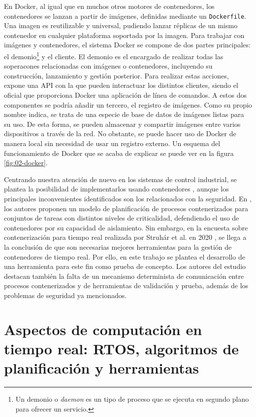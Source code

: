 En Docker, al igual que en muchos otros motores de contenedores, los
contenedores se lanzan a partir de imágenes, definidas mediante un
\texttt{Dockerfile}. Una imagen es reutilizable y universal, pudiendo lanzar
réplicas de un mismo contenedor en cualquier plataforma soportada por la imagen.
Para trabajar con imágenes y contenedores, el sistema Docker se compone de dos
partes principales: el demonio\footnote{Un demonio o \textit{daemon} es un tipo
  de proceso que se ejecuta en segundo plano para ofrecer un servicio.} y el
cliente. El demonio es el encargado de realizar todas las soperacones
relacionadas con imágenes o contenedores, incluyendo su construcción,
lanzamiento y gestión posterior. Para realizar estas acciones, expone una API
con la que pueden interactuar los distintos clientes, siendo el oficial que
proporciona Docker una aplicación de línea de comandos. A estos dos componentes
se podría añadir un tercero, el registro de imágenes. Como su propio nombre
indica, se trata de una especie de base de datos de imágenes listas para su uso.
De esta forma, se pueden almacenar y compartir imágenes entre varios
dispositivos a través de la red. No obstante, se puede hacer uso de Docker de
manera local sin necesidad de usar un registro externo. Un esquema del
funcionamiento de Docker que se acaba de explicar se puede ver en la figura
\ref{fig:02-docker}.

Centrando nuestra atención de nuevo en los sistemas de control industrial, se
plantea la posibilidad de implementarlos usando contenedores
\cite{hofer_industrial_2019}, aunque los principales inconvenientes
identificados son los relacionados con la seguridad. En
\cite{cinque_rt-cases_2019}, los autores proponen un modelo de planificación de
procesos contenerizados para conjuntos de tareas con distintos niveles de
criticalidad, defendiendo el uso de contenedores por su capacidad de
aislamiento. Sin embargo, en la encuesta sobre contenerización para tiempo real
realizada por Struhár et al. en 2020 \cite{struhar_real-time_2020}, se llega a
la conclusión de que son necesarias mejores herramientas para la gestión de
contenedores de tiempo real. Por ello, en este trabajo se plantea el desarrollo
de una herramienta para este fin como prueba de concepto. Los autores del
estudio destacan también la falta de un mecanismo determinista de comunicación
entre procesos contenerizados y de herramientas de validación y prueba, además
de los problemas de seguridad ya mencionados.

\section{Aspectos de computación en tiempo real: RTOS, algoritmos de
  planificación y herramientas}
\label{sec:real-time}

